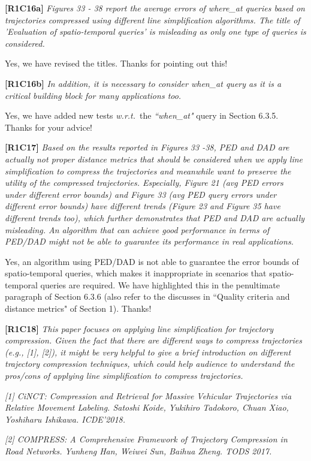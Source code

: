 \documentclass{letter}
\newcommand{\wrt}{\emph{w.r.t.}\xspace}
\begin{document}
{\textbf{[R1C16a]} \emph{ Figures 33 - 38 report the average errors of where\_at queries based on trajectories compressed using different line simplification algorithms. The title of 'Evaluation of spatio-temporal queries' is misleading as only one type of queries is considered.} 

Yes, we have revised the titles. Thanks for pointing out this!

\textbf{[R1C16b]} \emph{In addition, it is necessary to consider \emph{when\_at} query as it is a critical building block for many applications too.} 

Yes, we have added new tests \wrt~the \emph{``when\_at"} query in Section 6.3.5. Thanks for your advice!

\textbf{[R1C17]} \emph{ Based on the results reported in Figures 33 -38, PED and DAD are actually not proper distance metrics that should be considered when we apply line simplification to compress the trajectories and meanwhile want to preserve the utility of the compressed trajectories. Especially, Figure 21 (avg PED errors under different error bounds) and Figure 33 (avg PED query errors under different error bounds) have different trends (Figure 23 and Figure 35 have different trends too), which further demonstrates that PED and DAD are actually misleading. An algorithm that can achieve good performance in terms of PED/DAD might not be able to guarantee its performance in real applications. }

Yes, an algorithm using PED/DAD is not able to guarantee the error bounds of spatio-temporal queries, which makes it inappropriate in scenarios that spatio-temporal queries are required. We have highlighted this in the penultimate paragraph of Section 6.3.6 (also refer to the discusses in ``Quality criteria and distance metrics" of Section 1). Thanks!

\textbf{[R1C18]} \emph{ This paper focuses on applying line simplification for trajectory compression. Given the fact that there are different ways to compress trajectories (e.g., [1], [2]), it might be very helpful to give a brief introduction on different trajectory compression techniques, which could help audience to understand the pros/cons of applying line simplification to compress trajectories. }

\emph{ [1] CiNCT: Compression and Retrieval for Massive Vehicular Trajectories via Relative Movement Labeling. Satoshi Koide, Yukihiro Tadokoro, Chuan Xiao, Yoshiharu Ishikawa. ICDE'2018.}

\emph{ [2] COMPRESS: A Comprehensive Framework of Trajectory Compression in Road Networks. Yunheng Han, Weiwei Sun, Baihua Zheng. TODS 2017.}


}
\end{document}
